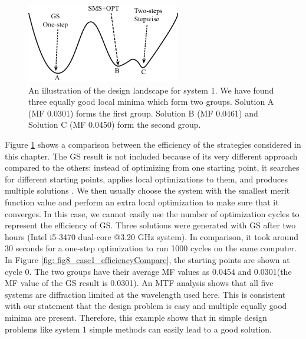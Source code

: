 \begin{figure}[h!]
    \centering
    \includegraphics[width=0.6\textwidth]{chapter-5/figures/Fig7_Landscape_illustration_sys1-2.png}
    \caption{An illustration of the design landscape for system 1. We have found three equally good local minima which form two groups. Solution A (MF 0.0301) forms the first group. Solution B (MF 0.0461) and Solution C (MF 0.0450) form the second group.}
    \label{fig: fig7_landscape_illus}
\end{figure}


Figure \ref{fig: fig7_landscape_illus} shows a comparison between the efficiency of the strategies considered in this chapter. The GS result is not included because of its very different approach compared to the others: instead of optimizing from one starting point, it searches for different starting points, applies local optimizations to them, and produces multiple solutions \cite{codevmanual}. We then usually choose the system with the smallest merit function value and perform an extra local optimization to make sure that it converges. In this case, we cannot easily use the number of optimization cycles to represent the efficiency of GS. Three solutions were generated with GS after two hours (Intel i5-3470 dual-core @3.20 GHz system). In comparison, it took around 30 seconds for a one-step optimization to run 1000 cycles on the same computer. In Figure \ref{fig: fig8_case1_efficiencyCompare}, the starting points are shown at cycle 0. The two groups have their average MF values as 0.0454 and 0.0301(the MF value of the GS result is 0.0301). An MTF analysis shows that all five systems are diffraction limited at the wavelength used here. This is consistent with our statement that the design problem is easy and multiple equally good minima are present. Therefore, this example shows that in simple design problems like system 1 simple methods can easily lead to a good solution. 

